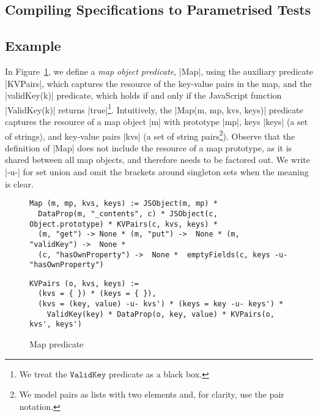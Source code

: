 
\subsection{Compiling Specifications to Parametrised Tests}

\subsection{Example} 

In Figure~\ref{fig:map:example}, we define a \emph{map object predicate}, \jsinline|Map|, 
using the auxiliary predicate \jsinline|KVPairs|, which captures the resource of the key-value pairs in the map, 
and the \jsinline|validKey(k)| predicate, which holds if and only if the 
JavaScript function \jsinline|ValidKey(k)| returns \jsinline|true|\footnote{We treat the $\mathtt{ValidKey}$ predicate as a black box.}.
%
Intuitively, the \jsinline|Map(m, mp, kvs, keys)| predicate captures the resource 
of a map object \jsinline|m| with prototype \jsinline|mp|, keys \jsinline|keys| (a set of strings),
and key-value pairs \jsinline|kvs| (a set of string pairs\footnote{We model pairs as lists with two elements and, for clarity, use the pair notation.}). 
Observe that the definition of \jsinline|Map| does not include the resource of a map prototype, as
it is shared between all map objects, and therefore needs to be factored out.  
%
We write \jsinline|-u-| for set union and omit the brackets around singleton 
sets when the meaning is clear. %

\begin{figure}[t!]
{\scriptsize
 \begin{verbatim}
Map (m, mp, kvs, keys) := JSObject(m, mp) * 
  DataProp(m, "_contents", c) * JSObject(c, Object.prototype) * KVPairs(c, kvs, keys) *
  (m, "get") -> None * (m, "put") ->  None * (m, "validKey") ->  None * 
  (c, "hasOwnProperty") ->  None *  emptyFields(c, keys -u- "hasOwnProperty")
  \end{verbatim}
  \vspace*{-0.3cm}
 \begin{verbatim}
KVPairs (o, kvs, keys) := 
  (kvs = { }) * (keys = { }),
  (kvs = (key, value) -u- kvs') * (keys = key -u- keys') * 
    ValidKey(key) * DataProp(o, key, value) * KVPairs(o, kvs', keys')
\end{verbatim}}
\caption{Map predicate \label{fig:map:example}}
\end{figure}

